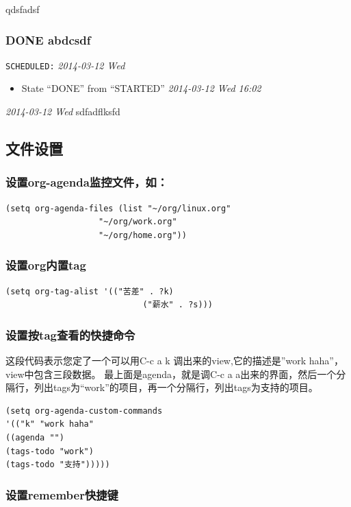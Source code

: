 \documentclass[11pt]{article}
\begin{document}
qdsfadsf
\subsubsection{\textbf{DONE} abdcsdf}
\label{sec-7-1-2}

    \texttt{SCHEDULED:} \textit{2014-03-12 Wed}

\begin{itemize}
\item State ``DONE''       from ``STARTED''    \textit{2014-03-12 Wed 16:02}
\end{itemize}
\textit{2014-03-12 Wed}
sdfadflksfd
\subsection{文件设置}
\label{sec-7-2}
\subsubsection{设置org-agenda监控文件，如：}
\label{sec-7-2-1}


\begin{verbatim}
(setq org-agenda-files (list "~/org/linux.org"
                   "~/org/work.org"
                   "~/org/home.org"))
\end{verbatim}
\subsubsection{设置org内置tag}
\label{sec-7-2-2}


\begin{verbatim}
(setq org-tag-alist '(("苦差" . ?k)
                            ("薪水" . ?s)))
\end{verbatim}
\subsubsection{设置按tag查看的快捷命令}
\label{sec-7-2-3}

      这段代码表示您定了一个可以用C-c a k 调出来的view,它的描述是”work haha”，view中包含三段数据。
      最上面是agenda，就是调C-c a a出来的界面，然后一个分隔行，列出tags为“work”的项目，再一个分隔行，列出tags为支持的项目。

\begin{verbatim}
(setq org-agenda-custom-commands
'(("k" "work haha"
((agenda "")
(tags-todo "work")
(tags-todo "支持")))))
\end{verbatim}
\subsubsection{设置remember快捷键}
\label{sec-7-2-4}
\end{document}

